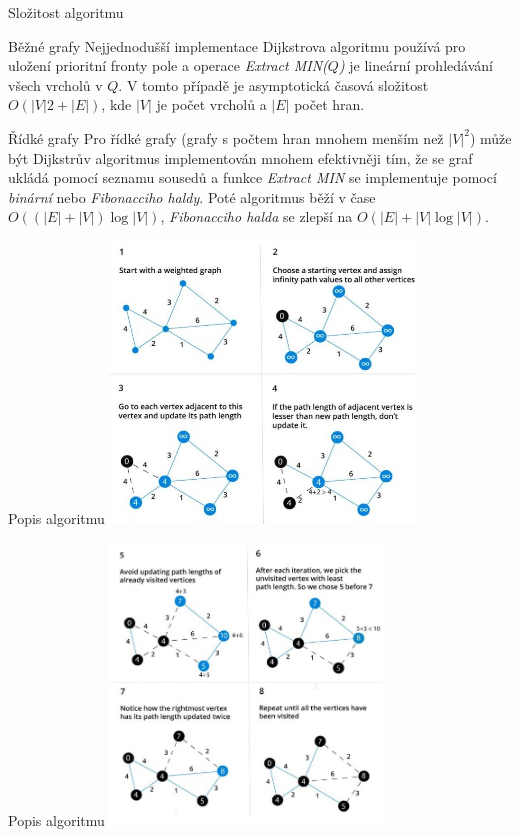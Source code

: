 \documentclass[czech]{beamer}
\begin{document}
\begin{frame}{Složitost algoritmu}
\begin{block}{Běžné grafy}
    Nejjednodušší implementace Dijkstrova algoritmu používá pro uložení prioritní fronty pole a operace \emph{Extract MIN($Q$)} je lineární prohledávání všech vrcholů v $Q$. V tomto případě je asymptotická časová složitost $O ( | V | 2 + | E | )$, kde $| V |$ je počet vrcholů a  $| E |$ počet hran. 
\end{block}
\begin{block}{Řídké grafy}
    Pro řídké grafy (grafy s počtem hran mnohem menším než $| V |^2$)  může být Dijkstrův algoritmus implementován mnohem efektivněji tím, že se graf ukládá pomocí seznamu sousedů a funkce \emph{Extract MIN} se implementuje pomocí \emph{binární} nebo \emph{Fibonacciho haldy}. \newline Poté algoritmus běží v čase $O ( ( | E | + | V | ) \log | V | )$, \emph{Fibonacciho halda} se zlepší na $O ( | E | + | V | \log | V | )$.
\end{block}
\end{frame}

\begin{frame}{Popis algoritmu}
\includegraphics[height=7.5cm]{Dijkstra's-algorithm-1.jpg}
\centering
\end{frame}

\begin{frame}{Popis algoritmu}
\includegraphics[height=7.5cm]{Dijkstra's-algorithm-2.jpg}
\centering
\end{frame}
\end{document}
